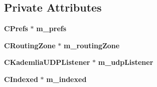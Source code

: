 \subsection*{Private Attributes}
\begin{DoxyCompactItemize}
\item 
{\bf CPrefs} $\ast$ {\bfseries m\_\-prefs}\label{classKademlia_1_1CKademlia_a843d65c5d31c22700468e9da34319cbe}

\item 
{\bf CRoutingZone} $\ast$ {\bfseries m\_\-routingZone}\label{classKademlia_1_1CKademlia_ae14654497b0b47bda67724d15223b954}

\item 
{\bf CKademliaUDPListener} $\ast$ {\bfseries m\_\-udpListener}\label{classKademlia_1_1CKademlia_aa12ab7f56685f76b41aec672e8e9aa3e}

\item 
{\bf CIndexed} $\ast$ {\bfseries m\_\-indexed}\label{classKademlia_1_1CKademlia_ac5bf38dba9951d7ee402c1a830989439}

\end{DoxyCompactItemize}
